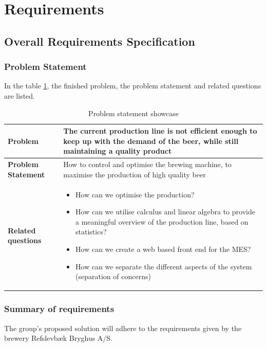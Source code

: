 \section{Requirements}

\subsection{Overall Requirements Specification}
\subsubsection{Problem Statement}
In the table \ref{table:problem-statement}, the finished problem, the problem statement and related questions are listed.
\begin{table}[ht]
    \begin{tabularx}{\textwidth}{|>{\RaggedRight}p{4cm}|>{\RaggedRight}X|}
        \hline
        \textbf{Problem} & The current production line is not efficient enough to keep up with the demand of the beer, while still maintaining a quality product\\
        \hline
        \textbf{Problem Statement} & How to control and optimise the brewing machine, to maximise the production of high quality beer\\
        \hline
        \textbf{Related questions} & 
            \begin{itemize}
                \item How can we optimise the production?
                \item How can we utilise calculus and linear algebra to provide a meaningful overview of the production line, based on statistics?
                \item How can we create a web based front end for the MES?
                \item How can we separate the different aspects of the system (separation of concerns)
            \end{itemize}
        \\ 
        \hline
    \end{tabularx}
    \caption{Problem statement showcase} 
    \label{table:problem-statement}
\end{table} 

\subsubsection{Summary of requirements}
The group's proposed solution will adhere to the requirements given by the brewery Refslevbæk Bryghus A/S.

